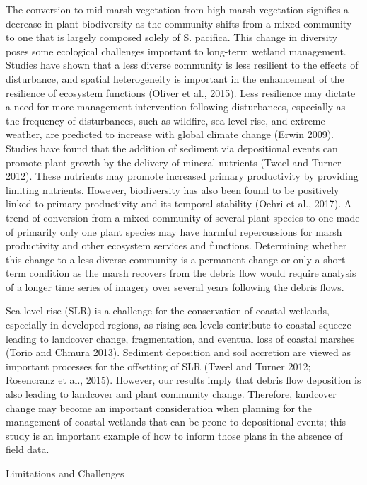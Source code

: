 \documentclass[
]{article}
\begin{document}
The conversion to mid marsh vegetation from high marsh vegetation
signifies a decrease in plant biodiversity as the community shifts from
a mixed community to one that is largely composed solely of S. pacifica.
This change in diversity poses some ecological challenges important to
long-term wetland management. Studies have shown that a less diverse
community is less resilient to the effects of disturbance, and spatial
heterogeneity is important in the enhancement of the resilience of
ecosystem functions (Oliver et al., 2015). Less resilience may dictate a
need for more management intervention following disturbances, especially
as the frequency of disturbances, such as wildfire, sea level rise, and
extreme weather, are predicted to increase with global climate change
(Erwin 2009). Studies have found that the addition of sediment via
depositional events can promote plant growth by the delivery of mineral
nutrients (Tweel and Turner 2012). These nutrients may promote increased
primary productivity by providing limiting nutrients. However,
biodiversity has also been found to be positively linked to primary
productivity and its temporal stability (Oehri et al., 2017). A trend of
conversion from a mixed community of several plant species to one made
of primarily only one plant species may have harmful repercussions for
marsh productivity and other ecosystem services and functions.
Determining whether this change to a less diverse community is a
permanent change or only a short-term condition as the marsh recovers
from the debris flow would require analysis of a longer time series of
imagery over several years following the debris flows.

Sea level rise (SLR) is a challenge for the conservation of coastal
wetlands, especially in developed regions, as rising sea levels
contribute to coastal squeeze leading to landcover change,
fragmentation, and eventual loss of coastal marshes (Torio and Chmura
2013). Sediment deposition and soil accretion are viewed as important
processes for the offsetting of SLR (Tweel and Turner 2012; Rosencranz
et al., 2015). However, our results imply that debris flow deposition is
also leading to landcover and plant community change. Therefore,
landcover change may become an important consideration when planning for
the management of coastal wetlands that can be prone to depositional
events; this study is an important example of how to inform those plans
in the absence of field data.

Limitations and Challenges
\end{document}

